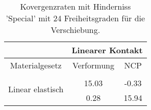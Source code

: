 \begin{table} 
\centering 
\begin{tabular}{c|cc|} 
\cline{2-3} 
 & \multicolumn{2}{|c|}{Linearer Kontakt} \\ 
\hline 
\multicolumn{1}{|c|}{Materialgesetz} & \multicolumn{1}{c|}{Verformung} & \multicolumn{1}{c|}{NCP} \\ 
\hline 
\multicolumn{1}{|c|}{\multirow{3}{*}{Linear elastisch}} &\multicolumn{1}{|c|}{} & \multicolumn{1}{|c|}{} \\ 
\multicolumn{1}{|c|}{} & \multicolumn{1}{|c|}{     15.03} & \multicolumn{1}{|c|}{     -0.33} \\ 
\multicolumn{1}{|c|}{} & \multicolumn{1}{|c|}{      0.28} & \multicolumn{1}{|c|}{     15.94} \\ 
\hline 
\end{tabular}\caption{Kovergenzraten mit Hinderniss 'Special' mit 24 Freiheitsgraden für die Verschiebung.}\label{tab:Rate_Special_level0}
\end{table} 
